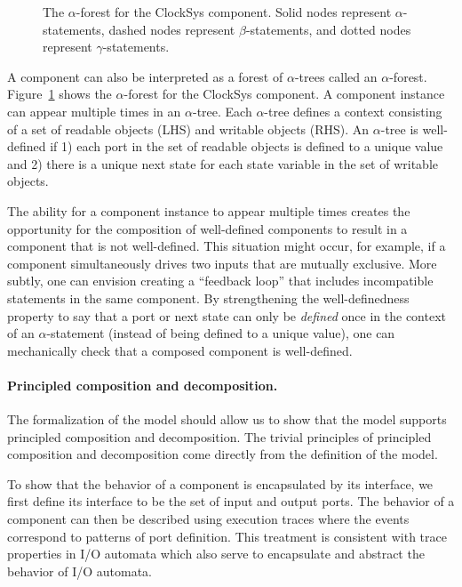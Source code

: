 \begin{figure}
{

\centerline{\box\graph}
}
\caption{The $\alpha$-forest for the ClockSys component\label{clocksys_component_alpha}.  Solid nodes represent $\alpha$-statements, dashed nodes represent $\beta$-statements, and dotted nodes represent $\gamma$-statements.}
\end{figure}

A component can also be interpreted as a forest of $\alpha$-trees called an $\alpha$-forest.
Figure~\ref{clocksys_component_alpha} shows the $\alpha$-forest for the ClockSys component.
A component instance can appear multiple times in an $\alpha$-tree.
Each $\alpha$-tree defines a context consisting of a set of readable objects (LHS) and writable objects (RHS).
An $\alpha$-tree is well-defined if 1) each port in the set of readable objects is defined to a unique value and 2) there is a unique next state for each state variable in the set of writable objects.

The ability for a component instance to appear multiple times creates the opportunity for the composition of well-defined components to result in a component that is not well-defined.
This situation might occur, for example, if a component simultaneously drives two inputs that are mutually exclusive.
More subtly, one can envision creating a ``feedback loop'' that includes incompatible statements in the same component.
By strengthening the well-definedness property to say that a port or next state can only be \emph{defined} once in the context of an $\alpha$-statement (instead of being defined to a unique value), one can mechanically check that a composed component is well-defined.

\paragraph{Principled composition and decomposition.}
The formalization of the model should allow us to show that the model supports principled composition and decomposition.
The trivial principles of principled composition and decomposition come directly from the definition of the model.

To show that the behavior of a component is encapsulated by its interface, we first define its interface to be the set of input and output ports.
The behavior of a component can then be described using execution traces where the events correspond to patterns of port definition.
This treatment is consistent with trace properties in I/O automata which also serve to encapsulate and abstract the behavior of I/O automata.

